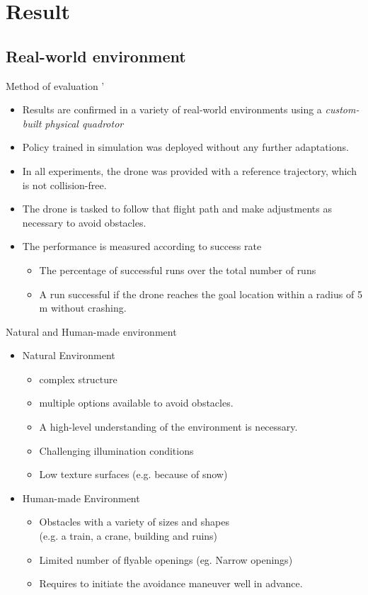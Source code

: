 \documentclass{beamer}
\begin{document}
\section{Result}

\subsection{Real-world environment}
\begin{frame}{Method of evaluation}
	'\begin{itemize}
		\item Results are confirmed in a variety of real-world environments using a \textit{custom-built physical quadrotor}
		\item Policy trained in simulation was deployed without any further adaptations.
		\item In all experiments, the drone was provided with a reference trajectory, which is not collision-free.
		\item The drone is tasked to follow that flight path and make adjustments as necessary to avoid obstacles.
		\item The performance is measured according to success rate
		\begin{itemize}
			\item The percentage of successful runs over the total number of runs
			\item A run successful if the drone reaches the goal location within a radius of 5 m without crashing.
		\end{itemize} 
	\end{itemize}
\end{frame}

\begin{frame}{Natural and Human-made environment}
	\begin{itemize}
		\item Natural Environment
		\begin{itemize}
			\item complex structure
			\item multiple options available to avoid obstacles. 
			\item A high-level understanding of the environment is necessary.
			\item Challenging illumination conditions
			\item Low texture surfaces (e.g. because of snow)
		\end{itemize}
	
		\item Human-made Environment
		\begin{itemize}
			\item Obstacles with a variety of sizes and shapes \\
			(e.g. a train, a crane, building and ruins)
			\item Limited number of flyable openings (eg. Narrow openings)
			\item Requires to initiate the avoidance maneuver well in advance.
		\end{itemize}
	\end{itemize}	
\end{frame}
\end{document}
